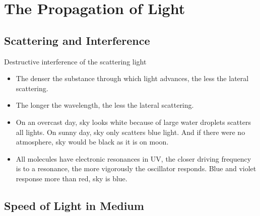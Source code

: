 \chapter{The Propagation of Light}

\section{Scattering and Interference}

Destructive interference of the scattering light

\begin{itemize}
\item The denser the substance through which light advances, the less the lateral scattering.
\item The longer the wavelength, the less the lateral scattering.
\item On an overcast day, sky looks white because of large water droplets scatters all lights. On sunny day, sky only scatters blue light. And if there were no atmosphere, sky would be black as it is on moon.
\item All molecules have electronic resonances in UV, the closer driving frequency is to a resonance, the more vigorously the oscillator responds. Blue and violet response more than red, sky is blue.
\end{itemize}

\section{Speed of Light in Medium}

